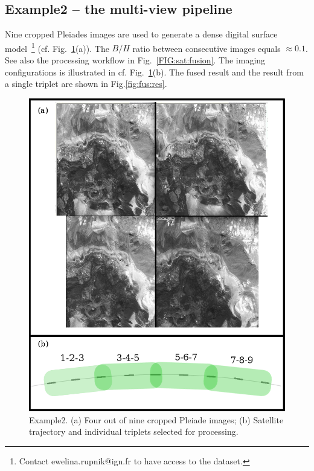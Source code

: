\subsection{Example2 -- the multi-view pipeline}
%
Nine cropped Pleiades images are used to generate a dense digital surface model~\footnote{Contact ewelina.rupnik@ign.fr to have access to the dataset.} (cf. Fig.~\ref{fig:fus:2stereo}(a)). The $B/H$ ratio between consecutive images equals $\approx 0.1$. See also the processing workflow in Fig.~\ref{FIG:sat:fusion}. The imaging configurations is illustrated in cf. Fig.~\ref{fig:fus:2stereo}(b). The fused result and the result from a single triplet are shown in Fig.\ref{fig:fus:res}.
%
\begin{figure}[h!]
\centering
\includegraphics[width=0.75\linewidth]{FIGS/Satellites/tpmm_overview.png}
\caption{Example2. (a) Four out of nine cropped Pleiade images; (b) Satellite trajectory and individual triplets selected for processing. }
\label{fig:fus:2stereo}
\end{figure}
